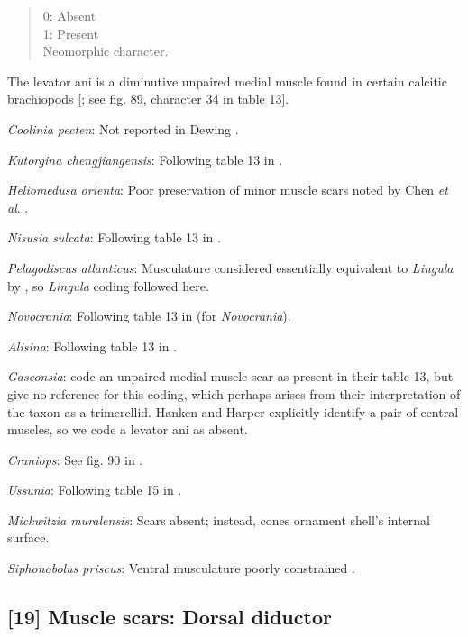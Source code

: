 \documentclass[]{book}
\theoremstyle{definition}
\theoremstyle{definition}
\theoremstyle{definition}
\theoremstyle{remark}
\begin{document}
\begin{quote}
0: Absent\\
1: Present\\
Neomorphic character.
\end{quote}

The levator ani is a diminutive unpaired medial muscle found in certain
calcitic brachiopods {[}\citet{Williams2000BrachiopodaLinguliformea};
see fig. 89, character 34 in table 13{]}.

\emph{Coolinia pecten}: Not reported in Dewing
\citeyearpar{Dewing2001Hingemodifications}.

\emph{Kutorgina chengjiangensis}: Following table 13 in
\citet{Williams2000BrachiopodaLinguliformea}.

\emph{Heliomedusa orienta}: Poor preservation of minor muscle scars
noted by Chen \emph{et al}. \citeyearpar{Chen2007Reinterpretationof}.

\emph{Nisusia sulcata}: Following table 13 in
\citet{Williams2000BrachiopodaLinguliformea}.

\emph{Pelagodiscus atlanticus}: Musculature considered essentially
equivalent to \emph{Lingula} by
\citet{Williams2000BrachiopodaLinguliformea}, so \emph{Lingula} coding
followed here.

\emph{Novocrania}: Following table 13 in
\citet{Williams2000BrachiopodaLinguliformea} (for \emph{Novocrania}).

\emph{Alisina}: Following table 13 in
\citet{Williams2000BrachiopodaLinguliformea}.

\emph{Gasconsia}: \citet{Williams2000BrachiopodaLinguliformea} code an
unpaired medial muscle scar as present in their table 13, but give no
reference for this coding, which perhaps arises from their
interpretation of the taxon as a trimerellid. Hanken and Harper
\citeyearpar[p.~249 and text-fig. 2]{Hanken1985Thetaxonomy} explicitly
identify a pair of central muscles, so we code a levator ani as absent.

\emph{Craniops}: See fig. 90 in
\citet{Williams2000BrachiopodaLinguliformea}.

\emph{Ussunia}: Following table 15 in
\citet{Williams2000BrachiopodaLinguliformea}.

\emph{Mickwitzia muralensis}: Scars absent; instead, cones ornament
shell's internal surface.

\emph{Siphonobolus priscus}: Ventral musculature poorly constrained
\citep{Williams2000BrachiopodaLinguliformea, Popov2009Earlyontogeny}.

\hypertarget{muscle-scars-dorsal-diductor}{%
\subsection*{{[}19{]} Muscle scars: Dorsal
diductor}\label{muscle-scars-dorsal-diductor}}
\end{document}

